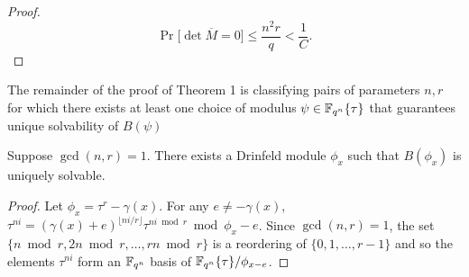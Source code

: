 \begin{proof}



\begin{equation*}
    \Pr\Big[\det \overline{M} = 0\Big] \leq \frac{n^2r}{q} < \frac{1}{C}.
\end{equation*}

\end{proof}





The remainder of the proof of Theorem 1 is classifying pairs of parameters $n,r$ for which there exists at least one choice of modulus $\psi \in \mathbb{F}_{q^n}\{\tau\}$ that guarantees unique solvability of $B(\psi)$

\begin{prop}\label{coprime}
Suppose $\gcd(n,r) = 1$. There exists a Drinfeld module $\phi_x$ such that $ B(\phi_x)$ is uniquely solvable.  %
\end{prop}
\begin{proof}
Let $\phi_x = \tau^r - \gamma(x)$. For any $e \neq -\gamma(x)$, $\tau^{ni} = (\gamma(x) + e)^{\lfloor ni/r \rfloor} \tau^{ni \bmod r} \bmod \phi_{x} - e$. Since $\gcd(n,r) = 1$, the set $\{ n \bmod r, 2n \bmod r, \ldots, rn \bmod r\}$ is a reordering of $\{0, 1, \ldots, r-1\}$ and so the elements $\tau^{ni}$ form an $\mathbb{F}_{q^n}$ basis of $\mathbb{F}_{q^n}\{ \tau\}/\phi_{x - e}$.
\end{proof}



